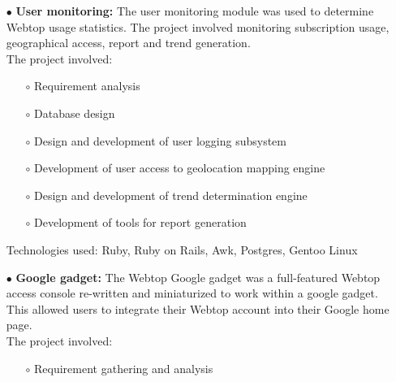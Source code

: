 \documentclass{scrartcl}
\begin{document}
\begin{cv}{
\href{http://www.develmj.com}{}
}
{\begin{itemize}
    themselves using an integrated chat client (browser-based).\\
    The project involved:
    \begin{itemize}
    \item[\footnotesize$\circ$] Design and development of the browser based chat system
    \item[\footnotesize$\circ$] Integration of JWChat with the existing Ruby on Rails based framework
    \item[\footnotesize$\circ$] Configuration and integration of ejbbaerd with the Rails backend
    \item[\footnotesize$\circ$] Design and development of user chat
      access rights engine
    \end{itemize}
    Technologies used: Ruby, Ruby on Rails, ejabberd, JWChat, XML
  \item[\footnotesize$\bullet$] \textbf{User monitoring: }The user monitoring module was used to determine
    Webtop usage statistics. The project involved monitoring subscription usage,
    geographical access, report and trend generation.\\
    The project involved:
    \begin{itemize}
    \item[\footnotesize$\circ$] Requirement analysis
    \item[\footnotesize$\circ$] Database design
    \item[\footnotesize$\circ$] Design and development of user logging subsystem
    \item[\footnotesize$\circ$] Development of user access to geolocation mapping engine
    \item[\footnotesize$\circ$] Design and development of trend determination engine
    \item[\footnotesize$\circ$] Development of tools for report
      generation
    \end{itemize}
    Technologies used: Ruby, Ruby on Rails, Awk, Postgres, Gentoo Linux
  \item[\footnotesize$\bullet$] \textbf{Google gadget: }The Webtop Google gadget was a full-featured Webtop
    access console re-written and miniaturized to work within a google gadget.
    This allowed users to integrate their Webtop account into their Google home
    page.\\
    The project involved:
    \begin{itemize}
    \item[\footnotesize$\circ$] Requirement gathering and analysis

\end{itemize}
\end{itemize}}
\end{cv}
\end{document}
